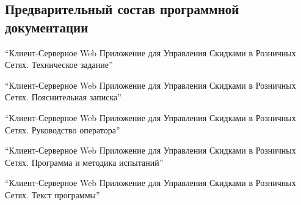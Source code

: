\subsection{Предварительный состав программной документации}
\begin{my_enumerate}
    \item ``Клиент-Серверное Web Приложение для Управления Скидками в Розничных Сетях. Техническое 
    задание''
    \item ``Клиент-Серверное Web Приложение для Управления Скидками в Розничных Сетях. Пояснительная 
    записка''
    \item ``Клиент-Серверное Web Приложение для Управления Скидками в Розничных Сетях. 
    Руководство оператора''
    \item ``Клиент-Серверное Web Приложение для Управления Скидками в Розничных Сетях. Программа и
    методика испытаний''
    \item ``Клиент-Серверное Web Приложение для Управления Скидками в Розничных Сетях. Текст программы''
\end{my_enumerate}

